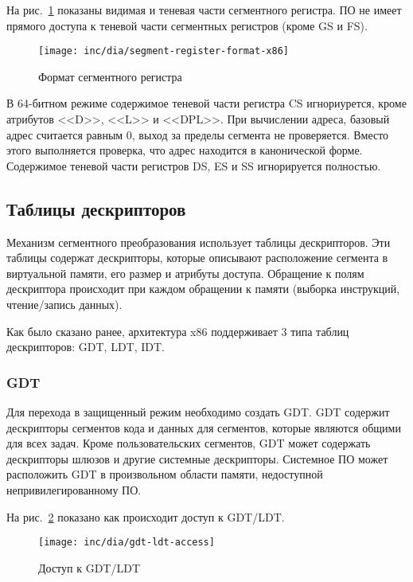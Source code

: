 На рис.~\ref{fig:segment-register-format-x86} показаны видимая и теневая части сегментного регистра.
ПО не имеет прямого доступа к теневой части сегментных регистров (кроме GS и FS).

\begin{figure}[ht!]
  \centering
  \texttt{[image: inc/dia/segment-register-format-x86]}
  \caption{Формат сегментного регистра}
  \label{fig:segment-register-format-x86}
\end{figure}

В 64-битном режиме содержимое теневой части регистра CS игнориурется, кроме атрибутов <<D>>, <<L>> и <<DPL>>.
При вычислении адреса, базовый адрес считается равным 0, выход за пределы сегмента не проверяется.
Вместо этого выполняется проверка, что адрес находится в канонической форме. Содержимое теневой части
регистров DS, ES и SS игнорируется полностью.

\subsection{Таблицы дескрипторов}
Механизм сегментного преобразования использует таблицы дескрипторов.
Эти таблицы содержат дескрипторы, которые описывают расположение сегмента в виртуальной памяти,
его размер и атрибуты доступа. Обращение к полям дескриптора происходит при каждом обращении к
памяти (выборка инструкций, чтение/запись данных).

Как было сказано ранее, архитектура x86 поддерживает 3 типа таблиц дескрипторов: GDT, LDT, IDT.

\subsubsection*{GDT}
Для перехода в защищенный режим необходимо создать GDT. GDT содержит дескрипторы
сегментов кода и данных для сегментов, которые являются общими для всех задач.
Кроме пользовательских сегментов, GDT может содержать дескрипторы шлюзов и
другие системные дескрипторы. Системное ПО может расположить GDT в произвольном
области памяти, недоступной непривилегированному ПО.

На рис.~\ref{fig:gdt-ldt-access} показано как происходит доступ к GDT/LDT.

\begin{figure}[ht!]
  \centering
  \texttt{[image: inc/dia/gdt-ldt-access]}
  \caption{Доступ к GDT/LDT}
  \label{fig:gdt-ldt-access}
\end{figure}

